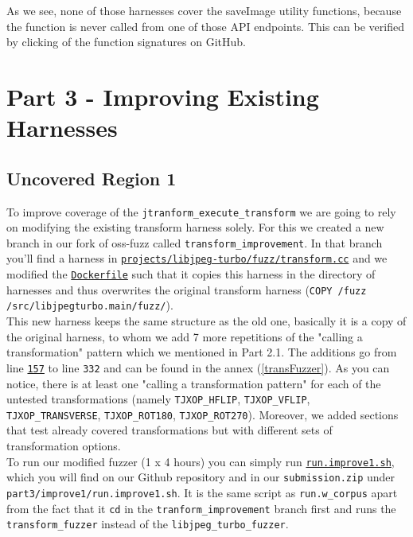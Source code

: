 \documentclass[12pt]{article}
\begin{document}
As we see, none of those harnesses cover the saveImage utility functions, because the function is never called from one of those API endpoints. This can be verified by clicking of the function signatures on GitHub.

\section{Part 3 - Improving Existing Harnesses}
\subsection{Uncovered Region 1}

To improve coverage of the \texttt{jtranform\_execute\_transform} we are going to rely on modifying the existing transform harness solely. For this we created a new branch in our fork of oss-fuzz called \texttt{transform\_improvement}. In that branch you'll find a harness in \href{https://github.com/roxannecvl/oss-fuzz/blob/transform_improvement/projects/libjpeg-turbo/fuzz/transform.cc}{\texttt{projects/libjpeg-turbo/fuzz/transform.cc}} and we modified the \href{https://github.com/roxannecvl/oss-fuzz/blob/transform_improvement/projects/libjpeg-turbo/Dockerfile}{\texttt{Dockerfile}} such that it copies this harness in the directory of harnesses and thus overwrites the original transform harness (\texttt{COPY /fuzz /src/libjpeg\-turbo.main/fuzz/}). \\

\noindent This new harness keeps the same structure as the old one, basically it is a copy of the original harness, to whom we add 7 more repetitions of the "calling a transformation" pattern which we mentioned in Part 2.1. The additions go from line \href{https://github.com/roxannecvl/oss-fuzz/blob/transform_improvement/projects/libjpeg-turbo/fuzz/transform.cc#L157}{\texttt{157}} to line \texttt{332} and can be found in the annex (\autoref{transFuzzer}). As you can notice, there is at least one "calling a transformation pattern" for each of the untested transformations (namely \texttt{TJXOP\_HFLIP}, \texttt{TJXOP\_VFLIP}, \texttt{TJXOP\_TRANSVERSE}, \texttt{TJXOP\_ROT180}, \texttt{TJXOP\_ROT270}). Moreover, we added sections that test already covered transformations but with different sets of transformation options. \\

\noindent To run our modified fuzzer (1 x 4 hours) you can simply run \href{https://github.com/roxannecvl/oss-fuzz/blob/main/scripts/run.improve1.sh}{\texttt{run.improve1.sh}}, which you will find on our Github repository and in our \texttt{submission.zip} under \texttt{part3/improve1/run.improve1.sh}. It is the same script as \texttt{run.w\_corpus} apart from the fact that it \texttt{cd} in the \texttt{tranform\_improvement} branch first and runs the \texttt{transform\_fuzzer} instead of the \texttt{libjpeg\_turbo\_fuzzer}. 
\end{document}
